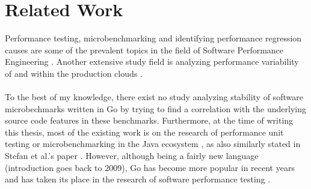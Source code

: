 \documentclass{seal_thesis}
\begin{document}
\section{Related Work}

Performance testing, microbenchmarking and identifying performance regression causes are some of the prevalent topics in the field of Software Performance Engineering \cite{laaber2019software, Laaber:2018:EOS:3196398.3196407, costa2019, chenshang, Nguyen:2014:ICS:2597073.2597092, Luo, Alcocer:2015:TDP:2816707.2816718, Stefan:2017:UTP:3030207.3030226, Horky:2015:UPU:2668930.2688051, Leitner:2017:ESS:3030207.3030213}. Another extensive study field is analyzing performance variability of and within the production clouds \cite{Iosup, Leitner:2016:PCS:2926746.2885497}.\\
\\
To the best of my knowledge, there exist no study analyzing stability of software microbechmarks written in Go by trying to find a correlation with the underlying source code features in these benchmarks. Furthermore, at the time of writing this thesis, most of the existing work is on the research of performance unit testing or microbenchmarking in the Java ecosystem \cite{Stefan:2017:UTP:3030207.3030226, Horky:2015:UPU:2668930.2688051, Leitner:2017:ESS:3030207.3030213, costa2019}, as also similarly stated in Stefan et al.'s paper \cite{Stefan:2017:UTP:3030207.3030226}. However, although being a fairly new language (introduction goes back to 2009), Go has become more popular in recent years and has taken its place in the research of software performance testing \cite{laaber2019software, Laaber:2018:EOS:3196398.3196407}.\\
\\
\end{document}
